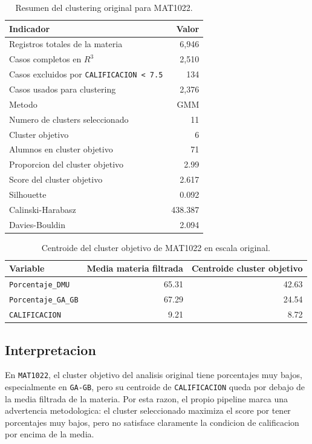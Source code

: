 \documentclass[11pt,letterpaper]{article}
\newcommand{\code}[1]{\texttt{#1}}
\begin{document}
\begin{table}[H]
\centering
\caption{Resumen del clustering original para MAT1022.}
\begin{tabular}{lr}
\toprule
Indicador & Valor \\
\midrule
Registros totales de la materia & 6,946 \\
Casos completos en $R^3$ & 2,510 \\
Casos excluidos por \code{CALIFICACION < 7.5} & 134 \\
Casos usados para clustering & 2,376 \\
Metodo & GMM \\
Numero de clusters seleccionado & 11 \\
Cluster objetivo & 6 \\
Alumnos en cluster objetivo & 71 \\
Proporcion del cluster objetivo & 2.99 \\
Score del cluster objetivo & 2.617 \\
Silhouette & 0.092 \\
Calinski-Harabasz & 438.387 \\
Davies-Bouldin & 2.094 \\
\bottomrule
\end{tabular}
\end{table}

\begin{table}[H]
\centering
\caption{Centroide del cluster objetivo de MAT1022 en escala original.}
\begin{tabular}{lrr}
\toprule
Variable & Media materia filtrada & Centroide cluster objetivo \\
\midrule
\code{Porcentaje\_DMU} & 65.31 & 42.63 \\
\code{Porcentaje\_GA\_GB} & 67.29 & 24.54 \\
\code{CALIFICACION} & 9.21 & 8.72 \\
\bottomrule
\end{tabular}
\end{table}

\subsection{Interpretacion}

En \code{MAT1022}, el cluster objetivo del analisis original tiene porcentajes muy bajos, especialmente en \code{GA-GB}, pero su centroide de \code{CALIFICACION} queda por debajo de la media filtrada de la materia. Por esta razon, el propio pipeline marca una advertencia metodologica: el cluster seleccionado maximiza el score por tener porcentajes muy bajos, pero no satisface claramente la condicion de calificacion por encima de la media.
\end{document}
